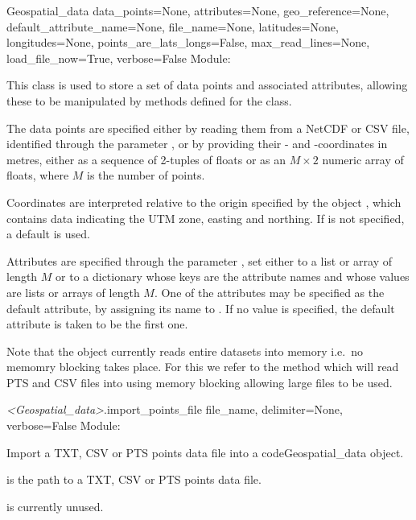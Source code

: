 \documentclass{manual}
\begin{document}
\begin{classdesc}{Geospatial_data}
                {data_points=None,
                 attributes=None,
                 geo_reference=None,
                 default_attribute_name=None,
                 file_name=None,
                 latitudes=None,
                 longitudes=None,
                 points_are_lats_longs=False,
                 max_read_lines=None,
                 load_file_now=True,
                 verbose=False}
Module: 

This class is used to store a set of data points and associated
attributes, allowing these to be manipulated by methods defined for
the class.

The data points are specified either by reading them from a NetCDF
or CSV file, identified through the parameter , or
by providing their - and -coordinates in metres,
either as a sequence of 2-tuples of floats or as an $M \times 2$
numeric array of floats, where $M$ is the number of points.

Coordinates are interpreted relative to the origin specified by the
object , which contains data indicating the UTM
zone, easting and northing. If  is not
specified, a default is used.

Attributes are specified through the parameter ,
set either to a list or array of length $M$ or to a dictionary whose
keys are the attribute names and whose values are lists or arrays of
length $M$. One of the attributes may be specified as the default
attribute, by assigning its name to .
If no value is specified, the default attribute is taken to be the
first one.

Note that the  object currently reads entire datasets
into memory i.e.\ no memomry blocking takes place.
For this we refer to the  method which will read PTS and CSV
files into \anuga using memory blocking allowing large files to be used.
\end{classdesc}

\begin{methoddesc}{\emph{<Geospatial_data>}.import_points_file}
        {file_name, delimiter=None, verbose=False}
Module: 

Import a TXT, CSV or PTS points data file into a code{Geospatial_data} object.

 is the path to a TXT, CSV or PTS points data file.

 is currently unused.
\end{methoddesc}
\end{document}
